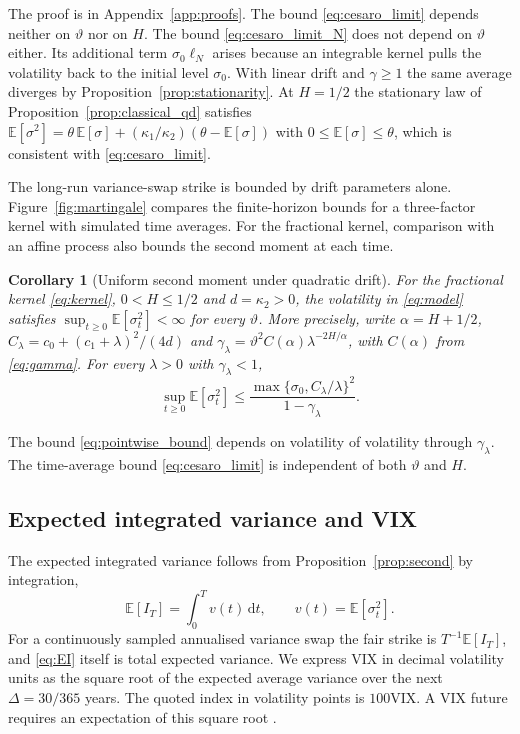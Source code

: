 \documentclass[11pt,a4paper]{article}
\newtheorem{corollary}[theorem]{Corollary}
\theoremstyle{definition}
\newcommand{\D}{\mathrm{d}}
\newcommand{\E}{\mathbb{E}}
\newcommand{\VIX}{\mathrm{VIX}}
\begin{document}
The proof is in Appendix~\ref{app:proofs}. The bound \eqref{eq:cesaro_limit} depends neither on $\vartheta$ nor on $H$. The bound \eqref{eq:cesaro_limit_N} does not depend on $\vartheta$ either. Its additional term $\sigma_0\ell_N$ arises because an integrable kernel pulls the volatility back to the initial level $\sigma_0$. With linear drift and $\gamma\ge1$ the same average diverges by Proposition~\ref{prop:stationarity}. At $H=1/2$ the stationary law of Proposition~\ref{prop:classical_qd} satisfies $\E[\sigma^2]=\theta\,\E[\sigma]+(\kappa_1/\kappa_2)(\theta-\E[\sigma])$ with $0\le\E[\sigma]\le\theta$, which is consistent with \eqref{eq:cesaro_limit}.

The long-run variance-swap strike is bounded by drift parameters alone. Figure~\ref{fig:martingale} compares the finite-horizon bounds for a three-factor kernel with simulated time averages. For the fractional kernel, comparison with an affine process also bounds the second moment at each time.

\begin{corollary}[Uniform second moment under quadratic drift]\label{cor:pointwise}
For the fractional kernel \eqref{eq:kernel}, $0<H\le1/2$ and $d=\kappa_2>0$, the volatility in \eqref{eq:model} satisfies $\sup_{t\ge0}\E[\sigma_t^2]<\infty$ for every $\vartheta$. More precisely, write $\alpha=H+1/2$, $C_\lambda=c_0+(c_1+\lambda)^2/(4d)$ and $\gamma_\lambda=\vartheta^2 C(\alpha)\lambda^{-2H/\alpha}$, with $C(\alpha)$ from \eqref{eq:gamma}. For every $\lambda>0$ with $\gamma_\lambda<1$,
\begin{equation}\label{eq:pointwise_bound}
\sup_{t\ge0}\E[\sigma_t^2]\le\frac{\max\{\sigma_0,C_\lambda/\lambda\}^2}{1-\gamma_\lambda}.
\end{equation}
\end{corollary}
The bound \eqref{eq:pointwise_bound} depends on volatility of volatility through $\gamma_\lambda$. The time-average bound \eqref{eq:cesaro_limit} is independent of both $\vartheta$ and $H$.

\subsection{Expected integrated variance and VIX}

The expected integrated variance follows from Proposition~\ref{prop:second} by integration,
\begin{equation}\label{eq:EI}
\E[I_T]=\int_0^T v(t)\,\D t,\qquad v(t)=\E[\sigma_t^2] .
\end{equation}
For a continuously sampled annualised variance swap the fair strike is $T^{-1}\E[I_T]$, and \eqref{eq:EI} itself is total expected variance. We express VIX in decimal volatility units as the square root of the expected average variance over the next $\Delta=30/365$ years. The quoted index in volatility points is $100\VIX$. A VIX future requires an expectation of this square root \citep{Sepp2008}.
\end{document}
